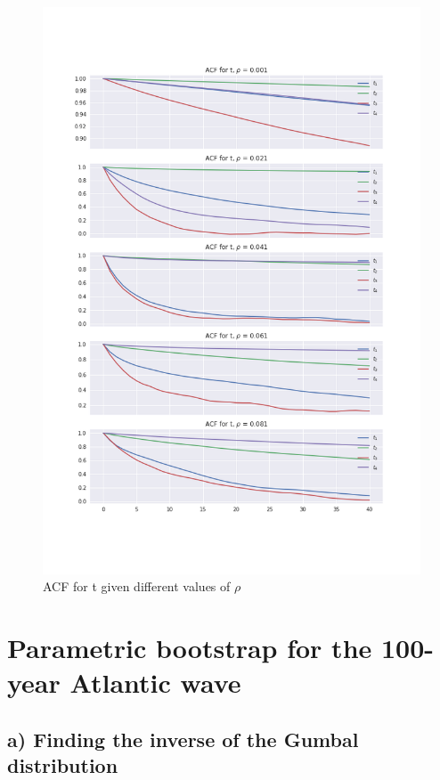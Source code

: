 \documentclass[a4paper]{article}
\begin{document}
\begin{figure}[H]
    \centering
    \includegraphics[width = 1.0\textwidth]{images/ACF.png} 
    \caption{ACF for t given different values of $\rho$}
    \label{fig:acf}
\end{figure}

\newpage

\section{Parametric bootstrap for the 100-year Atlantic wave}

\subsection*{a) Finding the inverse of the Gumbal distribution}
\end{document}

